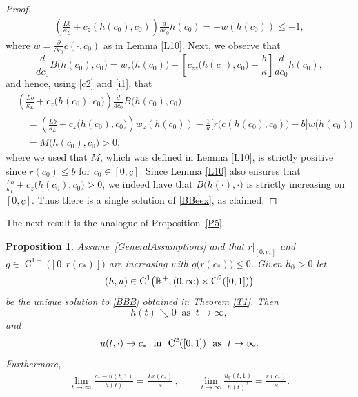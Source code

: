 \documentclass[reqno,11pt]{amsart}
\newtheorem{prop}[thm]{Proposition}
\numberwithin{equation}{section}
\begin{document}
\begin{proof}
\begin{align}
\left(\frac{Lb}{\kappa_L}+ c_z(h(c_0),c_0)\right)\frac{d}{d c_0}h(c_0)=-w(h(c_0))\le -1,
\end{align}
where $w=\frac{\partial}{\partial{c_0}} c(\cdot,c_0)$ as in Lemma \eqref{L10}. Next,
  we observe that
  \begin{equation*}
    \frac{d}{d c_0}  B\bigl( h(c_0), c_0\bigr)=w_z\bigl(
    h(c_0)\bigr)+\left[ c_{zz}\bigl(h(c_0),c_0\bigr)-\frac{b}{\kappa}\right]
    \frac{d}{dc_0}h(c_0),
  \end{equation*}
  and hence, using \eqref{c2} and \eqref{i1}, that
  \begin{align*}
    &\left(\frac{Lb}{\kappa_L}+c_z\bigl( h(c_0),c_0\bigr)\right)
    \frac{d}{dc_0}  B\bigl( h(c_0),c_0\bigr) \\
    &\quad =\left(\frac{Lb}{\kappa_L}+c_z\bigl(
      h(c_0),c_0\bigr)\right)
    w_z(h(c_0))-\frac{1}{\kappa}\bigl[r\bigl(c(h(c_0),c_0)\bigr)-b\bigr]
    w\bigl( h(c_0)\bigr)\\
    &\quad=M\bigl( h(c_0),c_0\bigr)>0,
  \end{align*}
  where we used that $M$, which was defined in Lemma \ref{L10}, is
  strictly positive since $r(c_0)\le b$ for $c_0\in[0,\underline{c}]$. Since Lemma
  \ref{L10}
  also ensures that $\frac{Lb}{\kappa_L}+c_z\bigl(
  h(c_0),c_0\bigr)>0$, we indeed have that $B\bigl(
  h(\cdot),\cdot\bigr)$ is strictly increasing on
  $[0,\underline{c}]$. Thus there is a single solution of
  \eqref{BBeex}, as claimed.
\end{proof}

The next result is the analogue of Proposition~\ref{P5}.

\begin{prop}\label{P3}
Assume~\eqref{GeneralAssumptions} and that $r\big |_{[0,c_*]}$ and
$g\in \operatorname{C}^{1-}\Big([0,r(c_*)]\Bigr)$ are increasing with
$g\bigl(r(c_*)\bigr)\leq 0$. Given $h_0>0$ let
$$
(h,u)\in {\rm C}^1\big( \mathbb{R}^+,(0,\infty)\times
{\rm C}^2([0,1]) \big)
$$
be the unique solution to \eqref{BBB} obtained in Theorem
\ref{T1}. Then
$$
h(t)\searrow 0\ \text{ as }\ t\to\infty,
$$
and
$$
u(t,\cdot)\to c_*\  \text{ in } \ {\rm C}^2([0,1])\ \text{ as }\ t\to\infty.
$$
Furthermore,
\begin{align}\label{t0}
  \lim_{t\to\infty}\frac{c_*-u(t,1)}{h(t)}= \frac{L
  r(c_*)}{\kappa}\,,\qquad
  \lim_{t\to\infty}\frac{u_y(t,1)}{h(t)^2}= \frac{r(c_*)}{\kappa}.
\end{align}
\end{prop}
\end{document}
